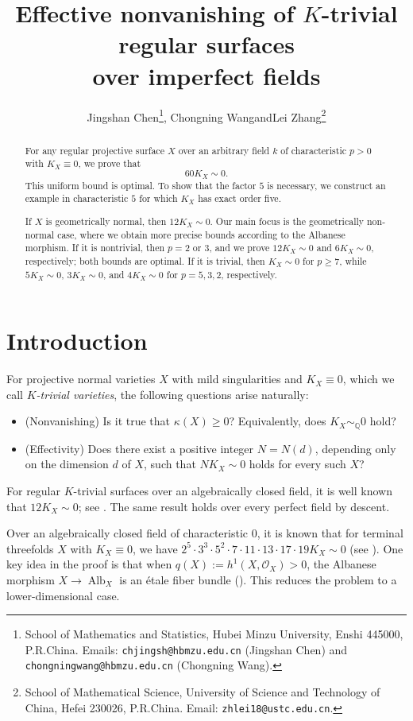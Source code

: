\documentclass[10pt,abstract=true]{scrartcl}
\title{\Large Effective nonvanishing of $K$-trivial regular surfaces\\over imperfect fields}
\author{Jingshan Chen\thanks{School of Mathematics and Statistics, Hubei Minzu University, Enshi 445000, P.R.China.
Emails: \texttt{chjingsh@hbmzu.edu.cn} (Jingshan Chen) and \texttt{chongningwang@hbmzu.edu.cn} (Chongning Wang).},\quad
Chongning Wang\footnotemark[1]\quad and\quad Lei Zhang\thanks{School of Mathematical Science, University of Science and Technology of China, Hefei 230026, P.R.China.
Email: \texttt{zhlei18@ustc.edu.cn}.}}
\date{}
\numberwithin{equation}{section}
\theoremstyle{definition}
\theoremstyle{remark}
\DeclareMathOperator\Alb{Alb}
\begin{document}
\maketitle
\begingroup
\renewcommand{\thefootnote}{}
\endgroup
\vspace{-2em}
\begin{abstract}
  For any regular projective surface $X$ over an arbitrary field $k$ of characteristic $p>0$ with $K_X\equiv0$, we prove that
  \[
    60K_X\sim0 .
  \]
  This uniform bound is optimal.
  To show that the factor $5$ is necessary, we construct an example in characteristic $5$ for which $K_X$ has exact order five.

  If $X$ is geometrically normal, then $12K_X\sim0$. 
  Our main focus is the geometrically non-normal case, where we obtain more precise bounds according to the Albanese morphism.
  If it is nontrivial, then $p=2$ or $3$, and we prove $12K_X\sim0$ and $6K_X\sim0$, respectively; both bounds are optimal.
  If it is trivial, then $K_X\sim0$ for $p\ge7$, while $5K_X\sim0$, $3K_X\sim0$, and $4K_X\sim0$ for $p=5,3,2$, respectively.
\end{abstract}
\tableofcontents

\section{Introduction}\label{sec:introduction}
For projective normal varieties $X$ with mild singularities and
$K_X \equiv 0$, which we call \emph{$K$-trivial varieties}, the following
questions arise naturally:
\begin{itemize}
  \item (Nonvanishing) Is it true that $\kappa(X) \ge 0$? Equivalently, does $K_X \sim_{\mathbb{Q}} 0$ hold?
  \item (Effectivity) Does there exist a positive integer $N= N(d)$, depending only on the dimension $d$ of $X$, such that $N K_X \sim 0$ holds for every such $X$?
\end{itemize}

For regular $K$-trivial surfaces over an algebraically closed field, it is well known that $12K_X\sim0$; see \cite{B-DF,BHPV,BM-II,BM-III}.
The same result holds over every perfect field by descent.

Over an algebraically closed field of characteristic $0$, it is known that for terminal threefolds $X$ with $K_X \equiv 0$, we have
$2^5 \cdot 3^3 \cdot 5^2 \cdot 7 \cdot 11 \cdot 13 \cdot 17 \cdot 19 K_X \sim 0$ (see \cite{Beauville83Rmk,Kaw86,Morrison86,Oguiso93}).
One key idea in the proof is that when $q(X) := h^1(X,\mathcal O_X) > 0$, the Albanese morphism $X\to \Alb_X$ is an étale fiber bundle (\cite{Kawamata-1985-minimal-model}). This reduces the problem to a lower-dimensional case. 
\end{document}
